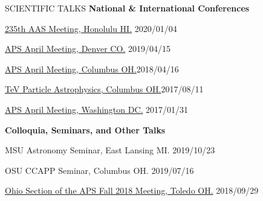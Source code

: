 \documentclass{resume} %
\begin{document}
\begin{rSection}{SCIENTIFIC TALKS}
{\bf National \& International Conferences}
\begin{etaremune}
\item \href{https://aapf-fellows.org/symposium/2020#BrianClark}{235th AAS Meeting, Honolulu HI.} \hfill 2020/01/04

\item \href{http://meetings.aps.org/Meeting/APR19/Session/R08.4}{APS April Meeting, Denver CO.} \hfill 2019/04/15

\item \href{http://meetings.aps.org/Meeting/APR18/Session/U17.7}{APS April Meeting, Columbus OH.}\hfill 2018/04/16

\item \href{http://indico.cern.ch/event/615891/contributions/2648790/}{TeV Particle Astrophysics, Columbus OH.}\hfill 2017/08/11

\item \href{http://meetings.aps.org/Meeting/APR17/Session/Y3.2}{APS April Meeting, Washington DC.} \hfill 2017/01/31
\end{etaremune}

{\bf Colloquia, Seminars, and Other Talks}
\begin{etaremune}

\item MSU Astronomy Seminar, East Lansing MI. \hfill 2019/10/23

\item OSU CCAPP Seminar, Columbus OH. \hfill 2019/07/16

\item \href{http://meetings.aps.org/Meeting/OSF18/Session/A01.2}{Ohio Section of the APS Fall 2018 Meeting, Toledo OH.} \hfill 2018/09/29


\end{etaremune}
\end{rSection}
\end{document}
